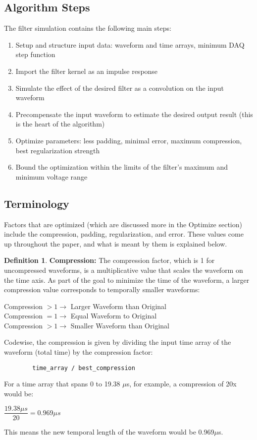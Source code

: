 \documentclass[11pt, a4paper]{article}
\theoremstyle{definition}
\newtheorem{definition}{Definition}[section]
\numberwithin{equation}{section}
\begin{document}
\subsection{Algorithm Steps}
The filter simulation contains the following main steps:

\begin{enumerate}
    \item Setup and structure input data: waveform and time arrays, minimum DAQ step function
    \item Import the filter kernel as an impulse response
    \item Simulate the effect of the desired filter as a convolution on the input waveform
    \item Precompensate the input waveform to estimate the desired output result (this is the heart of the algorithm)
    \item Optimize parameters: less padding, minimal error, maximum compression, best regularization strength
    \item Bound the optimization within the limits of the filter's maximum and minimum voltage range
\end{enumerate}

\subsection{Terminology}
Factors that are optimized (which are discussed more in the Optimize section) include the compression, padding, regularization, and error. These values come up throughout the paper, and what is meant by them is explained below.
\begin{definition}
     \textbf{Compression:} The compression factor, which is 1 for uncompressed waveforms, is a multiplicative value that scales the waveform on the time axis. As part of the goal to minimize the time of the waveform, a larger compression value corresponds to temporally smaller waveforms:
    \begin{center}
        Compression $> 1 \rightarrow$ Larger Waveform than Original \\
        Compression $= 1 \rightarrow$ Equal Waveform to Original \\
        Compression $> 1 \rightarrow$ Smaller Waveform than Original
    \end{center}
    Codewise, the compression is given by dividing the input time array of the waveform (total time) by the compression factor:
    \begin{verbatim}
        time_array / best_compression
    \end{verbatim}
    For a time array that spans 0 to 19.38 $\mu$s, for example, a compression of 20x would be:
    \begin{center}
        $\dfrac{19.38 \mu s}{20} = 0.969 \mu s$
    \end{center}
    This means the new temporal length of the waveform would be 0.969$\mu$s.
\end{definition}
\end{document}
